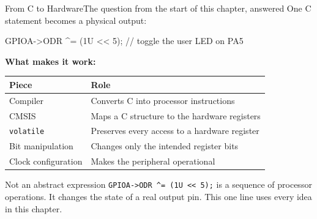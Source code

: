 \documentclass[9pt,aspectratio=169,xcolor=table]{beamer}
\newcommand{\shl}{\texttt{<{}<}}
\begin{document}
\begin{frame}[fragile]{From C to Hardware}{The question from the start of this chapter, answered}
    \leavevmode
    One C statement becomes a physical output:

    \vspace{2mm}
    \begin{center}
    \begin{minipage}{.9\textwidth}
\begin{cc}[basicstyle=\ttfamily\small]
GPIOA->ODR ^= (1U << 5);    // toggle the user LED on PA5
\end{cc}
    \end{minipage}
    \end{center}

    \vspace{2mm}
    {\small \textbf{What makes it work:}}
    \begin{center}
    {\small
    \striped
    \begin{tabular}{@{}l R{.56\textwidth}@{}}
        \toprule
        \textbf{Piece} & \textbf{Role} \\
        \midrule
        Compiler & Converts C into processor instructions \\
        CMSIS & Maps a C structure to the hardware registers \\
        \texttt{volatile} & Preserves every access to a hardware register \\
        Bit manipulation & Changes only the intended register bits \\
        Clock configuration & Makes the peripheral operational \\
        \bottomrule
    \end{tabular}}
    \end{center}

    \vspace{2mm}
    \begin{block}{Not an abstract expression}
        \texttt{GPIOA->ODR \^{}= (1U \shl\ 5);} is a sequence of
        processor operations. It changes the state of a \alert{real
        output pin}. This one line uses every idea in this chapter.
    \end{block}
\end{frame}
\end{document}
